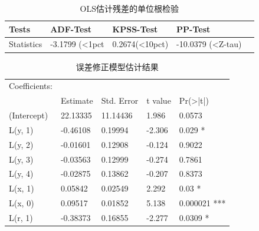 \documentclass[10.5pt,onecolumn,a4paper]{article}%
\begin{document}
\begin{table}[h!]
    \centering
    \caption{OLS估计残差的单位根检验}
    \label{tb:adf}
    \begin{tabular}{l | llll}
        Tests        & ADF-Test       & KPSS-Test      & PP-Test               \\  \hline
        Statistics   & -3.1799 (<1pct & 0.2674(<10pct) & -10.0379 (<Z-tau)  
    \end{tabular}
\end{table}

\begin{table}[h!]
    \centering
    \caption{误差修正模型估计结果}
    \label{tb:ecm}
    \begin{tabular}{l | llll}
        Coefficients: &          &            &         &                     \\
                      & Estimate & Std. Error & t value & Pr(\textgreater|t|) \\  \hline
        (Intercept)   & 22.13335 & 11.14436   & 1.986   & 0.0573              \\
        L(y, 1)       & -0.46108 & 0.19994    & -2.306  & 0.029 *             \\
        L(y, 2)       & -0.01601 & 0.12908    & -0.124  & 0.9022              \\
        L(y, 3)       & -0.03563 & 0.12999    & -0.274  & 0.7861              \\
        L(y, 4)       & -0.02875 & 0.13862    & -0.207  & 0.8373              \\
        L(x, 1)       & 0.05842  & 0.02549    & 2.292   & 0.03 *              \\
        L(x, 0)       & 0.09517  & 0.01852    & 5.138   & 0.000021 ***        \\
        L(r, 1)       & -0.38373 & 0.16855    & -2.277  & 0.0309 *           
    \end{tabular}
\end{table}


\end{document}
